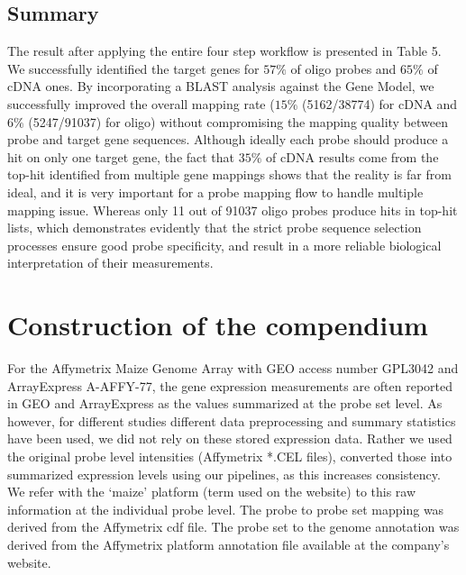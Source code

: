 \subsection*{Summary}

The result after applying the entire four step workflow is presented in Table 
5. We successfully identified 
the target genes for $57\%$ of oligo probes and $65\%$ of cDNA ones. By 
incorporating 
a BLAST analysis against 
the Gene Model, we successfully improved the overall mapping rate ($15\%$ 
(5162/38774) for cDNA and $6\%$ 
(5247/91037) for oligo) without compromising the mapping quality between probe 
and target gene 
sequences. Although ideally each probe should produce a hit on only one target 
gene, the fact that $35\%$ of 
cDNA results come from the top-hit identified from multiple gene mappings shows 
that the reality is far 
from ideal, and it is very important for a probe mapping flow to handle 
multiple mapping issue. Whereas 
only 11 out of 91037 oligo probes produce hits in top-hit lists, which 
demonstrates evidently that the 
strict probe sequence selection processes ensure good probe specificity, and 
result in a more reliable 
biological interpretation of their measurements. 










\section{Construction of the compendium}

For the Affymetrix Maize Genome Array with GEO access number
GPL3042 and ArrayExpress A-AFFY-77, the gene expression
measurements are often reported in GEO and ArrayExpress as the
values summarized at the probe set level.  As however, for
different studies different data preprocessing and summary
statistics have been used, we did not rely on these stored
expression data. Rather we used the original probe level
intensities (Affymetrix *.CEL files), converted those into
summarized expression levels using our pipelines, as this
increases consistency. We refer with the ‘maize’ platform (term
used on the website) to this raw information at the individual
probe level.  The probe to probe set mapping was derived from the
Affymetrix cdf file. The probe set to the genome annotation was
derived from the Affymetrix platform annotation file available at
the company’s website.

